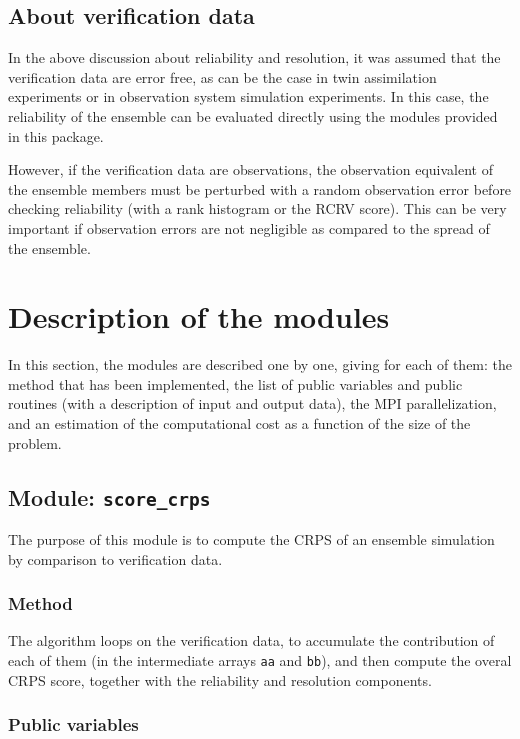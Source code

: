 \documentclass[11pt]{article}
\begin{document}
\subsection{About verification data}

In the above discussion about reliability and resolution,
it was assumed that the verification data are error free,
as can be the case in twin assimilation experiments or
in observation system simulation experiments.
In this case, the reliability of the ensemble
can be evaluated directly using the modules provided in this package.

However, if the verification data are observations,
the observation equivalent of the ensemble members
must be perturbed with a random observation error
before checking reliability (with a rank histogram or the RCRV score).
This can be very important if observation errors are not negligible
as compared to the spread of the ensemble.

\clearpage

\section{Description of the modules}

In this section,
the modules are described one by one,
giving for each of them:
the method that has been implemented,
the list of public variables and public routines
(with a description of input and output data),
the MPI parallelization, and
an estimation of the computational cost
as a function of the size of the problem.

\subsection{Module: {\tt\bf score\_crps}}

The purpose of this module is to compute the CRPS
of an ensemble simulation by comparison to verification data.

\subsubsection*{Method}

The algorithm loops on the verification data,
to accumulate the contribution of each of them
(in the intermediate arrays {\tt aa} and {\tt bb}),
and then compute the overal CRPS score,
together with the reliability and resolution components.

\subsubsection*{Public variables}
\end{document}
